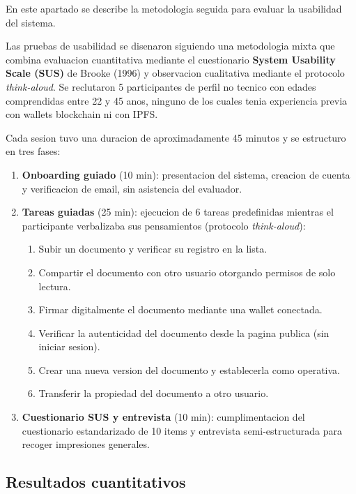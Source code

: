 \documentclass[11pt, a4paper]{article}
\begin{document}
En este apartado se describe la metodologia seguida para evaluar la usabilidad del sistema.

Las pruebas de usabilidad se disenaron siguiendo una metodologia mixta que combina evaluacion cuantitativa mediante el cuestionario \textbf{System Usability Scale (SUS)} de Brooke (1996) y observacion cualitativa mediante el protocolo \textit{think-aloud}. Se reclutaron 5 participantes de perfil no tecnico con edades comprendidas entre 22 y 45 anos, ninguno de los cuales tenia experiencia previa con wallets blockchain ni con IPFS.

Cada sesion tuvo una duracion de aproximadamente 45 minutos y se estructuro en tres fases:

\begin{enumerate}
    \item \textbf{Onboarding guiado} (10 min): presentacion del sistema, creacion de cuenta y verificacion de email, sin asistencia del evaluador.
    \item \textbf{Tareas guiadas} (25 min): ejecucion de 6 tareas predefinidas mientras el participante verbalizaba sus pensamientos (protocolo \textit{think-aloud}):
    \begin{enumerate}
        \item Subir un documento y verificar su registro en la lista.
        \item Compartir el documento con otro usuario otorgando permisos de solo lectura.
        \item Firmar digitalmente el documento mediante una wallet conectada.
        \item Verificar la autenticidad del documento desde la pagina publica (sin iniciar sesion).
        \item Crear una nueva version del documento y establecerla como operativa.
        \item Transferir la propiedad del documento a otro usuario.
    \end{enumerate}
    \item \textbf{Cuestionario SUS y entrevista} (10 min): cumplimentacion del cuestionario estandarizado de 10 items y entrevista semi-estructurada para recoger impresiones generales.
\end{enumerate}

\subsection{Resultados cuantitativos}
\end{document}
